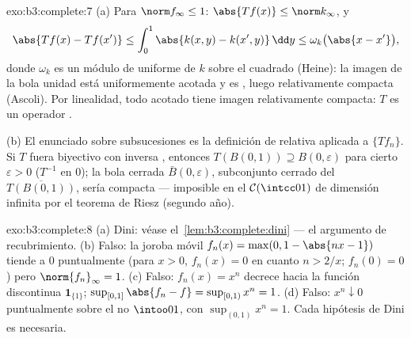 \begin{solution}{exo:b3:complete:7}
(a) Para $\norm f_\infty \leq 1$: $\abs{Tf(x)} \leq
\norm k_\infty$, y
\[
\abs{Tf(x) - Tf(x')} \leq \int_0^1\abs{k(x,y) -
k(x',y)}\,\dd y \leq \omega_k\bigl(\abs{x - x'}\bigr),
\]
donde $\omega_k$ es un módulo de
 uniforme de $k$ sobre
el cuadrado  (Heine): la
imagen de la bola unidad está uniformemente acotada y es
, luego
relativamente compacta (Ascoli). Por
linealidad, todo acotado tiene imagen relativamente
compacta: $T$ es un operador
.

(b) El enunciado sobre subsucesiones es la definición de 
relativa aplicada a $\{Tf_n\}$. Si $T$ fuera biyectivo con inversa
, entonces
$T(B(0,1)) \supseteq B(0,
\varepsilon)$ para cierto $\varepsilon > 0$ ($T^{-1}$
 en $0$); la bola cerrada
$\bar B(0,\varepsilon)$, subconjunto cerrado del
 $\overline{T(B(0,1))}$, sería
compacta --- imposible en el $\mathcal
C(\intcc01)$ de dimensión infinita por el teorema de Riesz (segundo
año).
\end{solution}

\begin{solution}{exo:b3:complete:8}
(a) Dini: véase el~\cref{lem:b3:complete:dini} --- el argumento de
recubrimiento. (b) Falso: la joroba móvil $f_n(x) = \max(0, 1 -
\abs{nx - 1})$ tiende a $0$ puntualmente (para $x > 0$, $f_n(x) =
0$ en cuanto $n > 2/x$; $f_n(0) = 0$) pero $\norm{f_n}_\infty = 1$. (c)
Falso: $f_n(x) = x^n$ decrece hacia la función discontinua
$\mathbf 1_{\{1\}}$; $\sup_{[0,1]}\abs{f_n - f} = \sup_{[0,1)}
x^n = 1$. (d) Falso: $x^n \downarrow 0$ puntualmente sobre el no
 $\intoo01$, con $\sup_{(0,1)}x^n = 1$. Cada hipótesis de Dini
es necesaria.
\end{solution}

